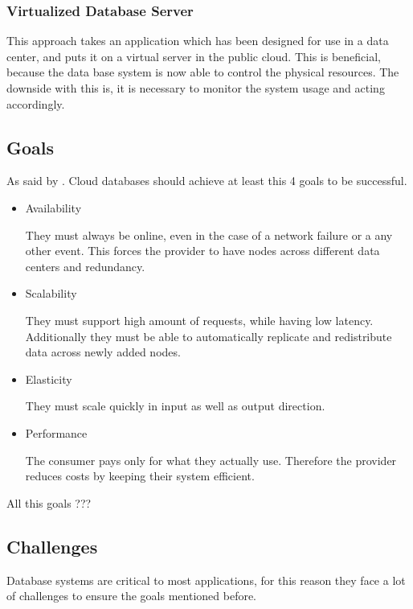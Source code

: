 \subsubsection{Virtualized Database Server}
\cite{zhao2013framework}
This approach takes an application which has been designed for use in a data center, and puts it on a virtual server in the public cloud. This is beneficial, because the data base system is now able to control the physical resources. The downside with this is, it is necessary to monitor the system usage and acting accordingly.




\subsection{Goals}

As said by \cite{sakr2014cloud}. Cloud databases should achieve at least this 4 goals to be successful.
\begin{itemize}
    \item Availability
    
    They must always be online, even in the case of a network failure or a any other event. This forces the provider to have nodes across different data centers and redundancy.
    
    \item Scalability
    
    They must support high amount of requests, while having low latency. Additionally they must be able to automatically replicate and redistribute data across newly added nodes.
    
    \item Elasticity
    
    They must scale quickly in input as well as output direction.
    
    \item Performance
    
    The consumer pays only for what they actually use. Therefore the provider reduces costs by keeping their system efficient.
\end{itemize}

All this goals ???

\subsection{Challenges}
Database systems are critical to most applications, for this reason they face a lot of challenges to ensure the goals mentioned before.\cite{sakr2014cloud}

